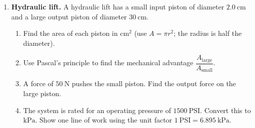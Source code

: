 \documentclass[12pt, twoside]{article}
\begin{document}
\begin{enumerate}[itemsep=0.45cm]
  \begin{enumerate}[itemsep=2.7cm]
    \item Find the tension $T$ in the chain.
    \item The mechanical advantage on the car is $\text{MA}=\dfrac{T}{F_\text{pull}}=\dfrac{1}{2\sin\theta}$. Evaluate it.
    \item As the chain is pulled tighter and $\theta$ gets \emph{smaller}, what happens to the force on the car? Explain in one or two sentences, and state one practical danger.
  \end{enumerate}
  \vspace{1.4cm}
\newpage
\item \textbf{Hydraulic lift.} A hydraulic lift has a small input piston of diameter $2.0~\text{cm}$ and a large output piston of diameter $30~\text{cm}$.

\begin{center}
\end{center}

  \begin{enumerate}[itemsep=2.7cm]
    \item Find the area of each piston in $\text{cm}^2$ (use $A=\pi r^2$; the radius is half the diameter).
    \item Use Pascal's principle to find the mechanical advantage $\dfrac{A_\text{large}}{A_\text{small}}$.
    \item A force of $50~\text{N}$ pushes the small piston. Find the output force on the large piston.
    \item The system is rated for an operating pressure of $1500~\text{PSI}$. Convert this to $\text{kPa}$. Show one line of work using the unit factor $1~\text{PSI}=6.895~\text{kPa}$.
  \end{enumerate}
  \vspace{1.2cm}

\end{enumerate}
\end{document}
